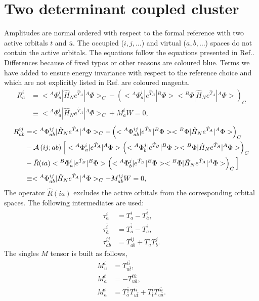 \documentclass[a4paper,12pt,oneside]{book}
\newcommand{\blue}[1]{{\color{blue} #1}}
\newcommand{\magenta}[1]{{\color{magenta} #1}}
\newcommand{\NL}{\nonumber \\}
\newcommand{\op}{\hat}
\newcommand{\ASop}[2]{{\cal A}\left(#1;#2\right)}
\newcommand{\spa}[1]{{#1}}
\newcommand{\spb}[1]{\bar{#1}}
\begin{document}
\chapter{Two determinant coupled cluster}
Amplitudes are normal ordered with respect to the formal reference with two active orbitals $t$ and $\spb{u}$.
The occupied ($i,j,\ldots$) and virtual ($a,b,\ldots$) spaces do not contain the active orbitals.
The equations follow the equations presented in Ref.\cite{szalay94}.
Differences because of fixed typos or other reasons are coloured \blue{blue}.
Terms we have added to ensure energy invariance with respect to the reference choice 
and which are not explicitly listed in Ref.\cite{szalay94} are coloured \magenta{magenta}.
\begin{align}
R^i_a &= < {}^A\Phi^i_a |\op H_N e^{\op T_A} | {}^A \Phi >_C - \left( < {}^A\Phi^i_a | e^{\op T_B} | {}^B\Phi ><{}^B\Phi | \op H_N e^{\op T_A} | {}^A \Phi> \right)_C \NL
      &\equiv < {}^A\Phi^i_a | \op H_N e^{\op T_A} | {}^A \Phi >_C + M^i_a W = 0,
\end{align}
\begin{align}
R^{ij}_{ab} &= <{}^A\Phi^{ij}_{ab} |\op H_N e^{\op T_A}| {}^A \Phi>_C - \left( <{}^A \Phi^{ij}_{ab} |e^{\op T_B}| {}^B \Phi><{}^B\Phi |\op H_N e^{\op T_A}| {}^A\Phi> \right)_C \NL
            &-\ASop{ij}{ab} \Big[ <{}^A \Phi^i_a |e^{\op T_A}| {}^A\Phi> \left( <{}^A\Phi^j_b |e^{\op T_B}| {}^B\Phi> <{}^B\Phi |\op H_N e^{\op T_A}| {}^A\Phi>  \right)_C \NL
                           &- \op R(ia) <{}^B \Phi^i_a |e^{\op T_B}| {}^B\Phi> \left( <{}^A\Phi^j_b |e^{\op T_B}| {}^B\Phi> <{}^B\Phi |\op H_N e^{\op T_A}| {}^A\Phi> \right)_C \Big] \NL
            &\equiv <{}^A\Phi^{ij}_{ab} |\op H_N e^{\op T_A}| {}^A\Phi>_C + M^{ij}_{ab} W = 0,
\end{align}
The operator $\op R(ia)$ excludes the active orbitals from the corresponding orbital spaces.
The following intermediates are used:
\begin{align}
\tau^{\spa{i}}_{\spa{a}}               &= T^{\spa{i}}_{\spa{a}} - T^{\spb{i}}_{\spb{a}}, \\
\tau^{\spb{i}}_{\spb{a}}               &= T^{\spb{i}}_{\spb{a}} - T^{\spa{i}}_{\spa{a}}, \\
\tau^{\spa{i}\spa{j}}_{\spa{a}\spa{b}} &= T^{\spa{i}\spa{j}}_{\spa{a}\spa{b}} + T^{\spa{i}}_{\spa{a}} T^{\spa{j}}_{\spa{b}}.
\end{align}
The singles $M$ tensor is built as follows,
\begin{align}
M^{\spa{i}}_{\spa{u}} &= T^{\spa{t}\spb{i}}_{\spa{u}\spb{t}}, \\
M^{\spa{t}}_{\spa{a}} &= -T^{\spa{t}\spb{u}}_{\spa{u}\spb{a}}, \\
M^{\spa{i}}_{\spa{a}} &= T^{\spb{u}}_{\spb{a}} T^{t\spb{i}}_{u\spb{t}} + T^{\spb{i}}_{\spb{t}} T^{t\spb{u}}_{u\spb{a}}.
\end{align}
\end{document}
